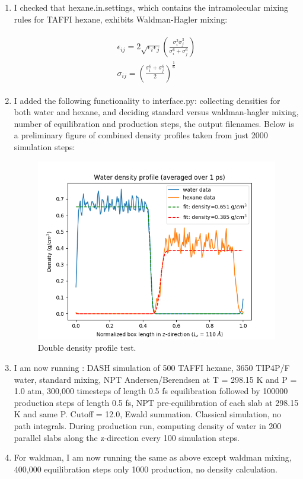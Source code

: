 \documentclass[12pt,reqno]{amsart}
\numberwithin{equation}{section}
\begin{document}
\begin{enumerate}
\item I checked that hexane.in.settings, which contains the intramolecular mixing rules for TAFFI hexane, exhibits Waldman-Hagler mixing:

\begin{align}
\begin{split}
\epsilon_{ij} = 2\sqrt{\epsilon_i\epsilon_j}\left(\frac{\sigma_i^3\dot\sigma_j^3}{\sigma_i^6 + \sigma_j^6}\right)\\
\sigma_{ij} = \left(\frac{\sigma_i^6 + \sigma_j^6}{2}\right)^{\frac{1}{6}}
\end{split}
\end{align}

\item I added the following functionality to interface.py: collecting densities for both water and hexane, and deciding standard versus waldman-hagler mixing, number of equilibration and production steps, the output filenames.  Below is a preliminary figure of combined density profiles taken from just 2000 simulation steps: 

\begin{figure}[H]
\centering
\includegraphics[scale=0.4]{double_profile_test}
\caption{Double density profile test.}
\end{figure}

\item I am now running : DASH simulation of 500 TAFFI hexane, 3650 TIP4P/F water, standard mixing, NPT Andersen/Berendsen at T = 298.15 K and P = 1.0 atm, 300,000 timesteps of length 0.5 fs equilibration followed by 100000 production steps of length 0.5 fs, NPT pre-equilibration of each slab at 298.15 K and same P.  Cutoff = 12.0, Ewald summation.  Classical simulation, no path integrals.  During production run, computing density of water in 200 parallel slabs along the z-direction every 100 simulation steps.  

\item For waldman, I am now running the same as above except waldman mixing, 400,000 equilibration steps only 1000 production, no density calculation.  

\end{enumerate}
\end{document}
